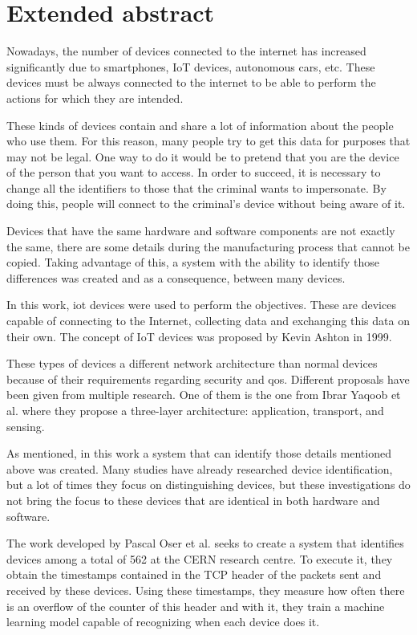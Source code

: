 
\chapter*{Extended abstract}
 \label{chap:abstract}

Nowadays, the number of devices connected to the internet has increased significantly due to smartphones, IoT devices, autonomous cars, etc. These devices must be always connected to the internet to be able to perform the actions for which they are intended. 

These kinds of devices contain and share a lot of information about the people who use them. For this reason, many people try to get this data for purposes that may not be legal. One way to do it would be to pretend that you are the device of the person that you want to access. In order to succeed, it is necessary to change all the identifiers to those that the criminal wants to impersonate. By doing this, people will connect to the criminal's device without being aware of it.


Devices that have the same hardware and software components are not exactly the same, there are some details during the manufacturing process that cannot be copied. Taking advantage of this, a system with the ability to identify those differences was created and as a consequence, between many devices.

In this work, \acrfull{iot} devices were used to perform the objectives. These are devices capable of connecting to the Internet, collecting data and exchanging this data on their own. The concept of IoT devices was proposed by Kevin Ashton in 1999.

These types of devices a different network architecture than normal devices because of their requirements regarding security and \acrfull{qos}. Different proposals have been given from multiple research. One of them is the one from Ibrar Yaqoob et al. \cite{yaqoob2017internet} where they propose a three-layer architecture: application, transport, and sensing.

As mentioned, in this work a system that can identify those details mentioned above was created. Many studies have already researched device identification, but a lot of times they focus on distinguishing devices, but these investigations do not bring the focus to these devices that are identical in both hardware and software.

The work developed by Pascal Oser et al. \cite{oser2018identifying} seeks to create a system that identifies devices among a total of 562 at the CERN research centre. To execute it, they obtain the timestamps contained in the TCP header of the packets sent and received by these devices. Using these timestamps, they measure how often there is an overflow of the counter of this header and with it, they train a machine learning model capable of recognizing when each device does it.


